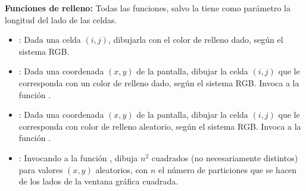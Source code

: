 {\bf Funciones de relleno:} Todas las funciones, salvo la  tiene como parámetro la longitud del lado de las celdas.
\begin{itemize}
\item {}: Dada una celda $(i, j)$, dibujarla con el color de relleno dado, según el sistema RGB.

\item {}: Dada una coordenada $(x, y)$ de la pantalla, dibujar la celda $(i, j)$ que le corresponda con un color de relleno dado, según el sistema RGB. Invoca a la función .

\item {}: Dada una coordenada $(x, y)$ de la pantalla, dibujar la celda $(i, j)$ que le corresponda con color de relleno aleatorio, según el sistema RGB.  Invoca a la función .

\item {}: Invocando a la función , dibuja $n^2$ cuadrados (no necesariamente distintos) para valores $(x, y)$ aleatorios, con $n$ el número de particiones que se hacen de los lados de la ventana gráfica cuadrada.
\end{itemize}


